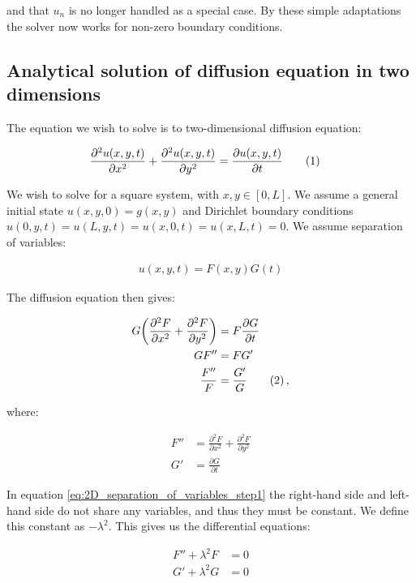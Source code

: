 \documentclass[reprint,english,notitlepage]{revtex4-1}  %
\newcommand\numberthis{\addtocounter{equation}{1}\tag{\theequation}}
\begin{document}
and that $u_n$ is no longer handled as a special case. By these simple adaptations the solver now works for non-zero boundary conditions.



\subsection{Analytical solution of diffusion equation in two dimensions} \label{sec:formalism_2D_diff_eq_analytical}

The equation we wish to solve is to two-dimensional diffusion equation:

\begin{align*}
\frac{\partial^2 u(x,y,t)}{\partial x^2} + \frac{\partial^2 u(x,y,t)}{\partial y^2} &= \frac{\partial u(x,y,t)}{\partial t} \numberthis \label{eq:2D_diffusion_equation}
\end{align*}

We wish to solve for a square system, with $x,y \in [0,L]$. We assume a general initial state $u(x,y,0) = g(x,y)$ and Dirichlet boundary conditions $u(0,y,t) = u(L,y,t) = u(x,0,t) = u(x,L,t) = 0$. We assume separation of variables:

\begin{align*}
u(x,y,t) = F(x,y) G(t)
\end{align*}

The diffusion equation then gives:

\begin{align*}
G\bigg( \frac{\partial^2 F}{\partial x^2} + \frac{\partial^2 F}{\partial y^2} \bigg) &= F\frac{\partial G}{\partial t} \\
GF'' &= FG'\\
\frac{F''}{F} &= \frac{G'}{G} \numberthis \label{eq:2D_separation_of_variables_step1} \, ,
\end{align*}

where:

\begin{align*}
F'' &= \frac{\partial^2 F}{\partial x^2} + \frac{\partial^2 F}{\partial y^2} \\
G' &= \frac{\partial G}{\partial t}
\end{align*}

In equation \eqref{eq:2D_separation_of_variables_step1} the right-hand side and left-hand side do not share any variables, and thus they must be constant. We define this constant as $-\lambda^2$. This gives us the differential equations:

\begin{align*}
F'' + \lambda^2 F &= 0 \\
G' + \lambda^2 G &= 0
\end{align*}
\end{document}
